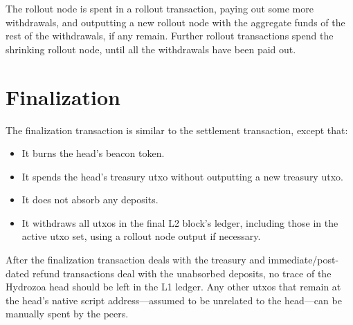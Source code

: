 \documentclass[../hydrozoa.tex]{subfiles}
\begin{document}
The rollout node is spent in a rollout transaction, paying out some more withdrawals, and outputting a new rollout node with the aggregate funds of the rest of the withdrawals, if any remain.
Further rollout transactions spend the shrinking rollout node, until all the withdrawals have been paid out.

\section{Finalization}%
\label{h:l1-multisig-finalization}%

The finalization transaction is similar to the settlement transaction, except that:
\begin{itemize}
  \item It burns the head's beacon token.
  \item It spends the head's treasury utxo without outputting a new treasury utxo.
  \item It does not absorb any deposits.
  \item It withdraws all utxos in the final L2 block's ledger, including those in the active utxo set, using a rollout node output if necessary.
\end{itemize}

After the finalization transaction deals with the treasury and immediate/post-dated refund transactions deal with the unabsorbed deposits, no trace of the Hydrozoa head should be left in the L1 ledger.
Any other utxos that remain at the head's native script address---assumed to be unrelated to the head---can be manually spent by the peers.
\end{document}
